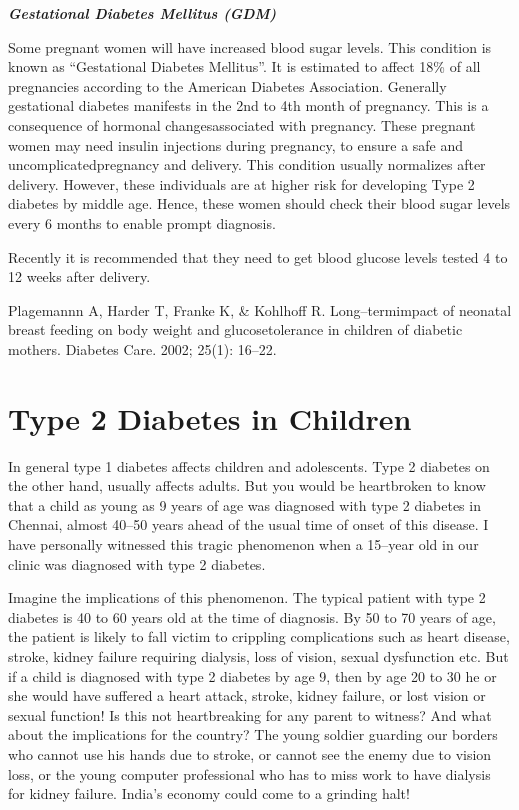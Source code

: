 \noindent
\textbf{\textit{Gestational Diabetes Mellitus (GDM)}}

Some pregnant women will have increased blood sugar levels. This condition is known as “Gestational Diabetes Mellitus”. It is estimated to affect 18\% of all pregnancies according to the American Diabetes Association. Generally gestational diabetes manifests in the 2nd to 4th month of pregnancy. This is a consequence of hormonal changes\break associated with pregnancy. These pregnant women may need insulin injections during pregnancy, to ensure a safe and uncomplicated\break pregnancy and delivery. This condition usually normalizes after deli\-very. However, these individuals are at higher risk for developing Type 2 diabetes by middle age. Hence, these women should check their blood sugar levels every 6 months to enable prompt diagnosis.

Recently it is recommended that they need to get blood glucose levels tested 4 to 12 weeks after delivery.

\begin{thebibliography}{99}
 Plagemannn A, Harder T, Franke K, \& Kohlhoff R. Long–term\break impact of neonatal breast feeding on body weight and glucose\break tolerance in children of diabetic mothers. Diabetes Care. 2002; 25(1): 16–22.
\end{thebibliography}


\chapter{Type 2 Diabetes in Children}\label{chap7}

In general type 1 diabetes affects children and adolescents. Type 2 diabetes on the other hand, usually affects adults. But you would be heartbroken to know that a child as young as 9 years of age was diagnosed with type 2 diabetes in Chennai, almost 40–50 years ahead of the usual time of onset of this disease. I have personally witnessed this tragic phenomenon when a 15–year old in our clinic was diagnosed with type 2 diabetes.

Imagine the implications of this phenomenon. The typical patient with type 2 diabetes is 40 to 60 years old at the time of diagnosis. By 50 to 70 years of age, the patient is likely to fall victim to crippling complications such as heart disease, stroke, kidney failure requiring dialysis, loss of vision, sexual dysfunction etc. But if a child is diagnosed with type 2 diabetes by age 9, then by age 20 to 30 he or she would have suffered a heart attack, stroke, kidney failure, or lost vision or sexual function! Is this not heartbreaking for any parent to witness? And what about the implications for the country? The young soldier guarding our borders who cannot use his hands due to stroke, or cannot see the enemy due to vision loss, or the young computer professional who has to miss work to have dialysis for kidney failure. India’s economy could come to a grinding halt!

